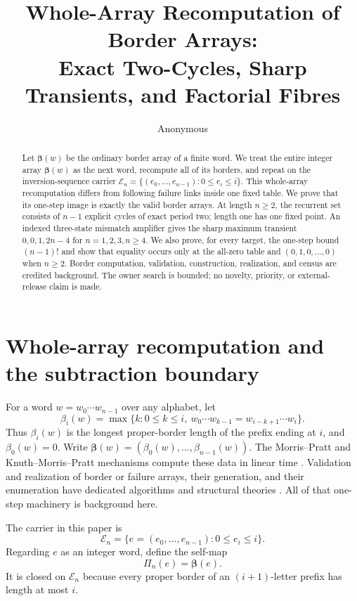 \documentclass[10pt,a4paper]{amsart}
\title[Whole-array recomputation of border arrays]{Whole-Array Recomputation of Border Arrays:\\
Exact Two-Cycles, Sharp Transients, and Factorial Fibres}
\author{Anonymous}
\date{}
\theoremstyle{definition}
\theoremstyle{remark}
\newcommand{\En}{\mathcal E_n}
\newcommand{\BA}{\boldsymbol\beta}
\begin{document}
\begin{abstract}
Let $\BA(w)$ be the ordinary border array of a finite word.  We treat the
entire integer array $\BA(w)$ as the next word, recompute all of its borders,
and repeat on the inversion-sequence carrier
$\En=\{(e_0,\ldots,e_{n-1}):0\le e_i\le i\}$.  This whole-array
recomputation differs from following failure links inside one fixed table.
We prove that its one-step image is exactly the valid border arrays.  At
length $n\ge2$, the recurrent set consists of $n-1$ explicit cycles of exact
period two; length one has one fixed point.  An indexed three-state mismatch
amplifier gives the sharp maximum transient
$0,0,1,2n-4$ for $n=1,2,3,n\ge4$.  We also prove, for every target, the
one-step bound $(n-1)!$ and show that equality occurs only at the all-zero
table and $(0,1,0,\ldots,0)$ when $n\ge2$.  Border computation, validation,
construction, realization, and census are credited background.  The owner
search is bounded; no novelty, priority, or external-release claim is made.
\end{abstract}

\maketitle

\section{Whole-array recomputation and the subtraction boundary}

For a word $w=w_0\cdots w_{n-1}$ over any alphabet, let
\begin{equation}
 \beta_i(w)=\max\{k:0\le k\le i,\ 
 w_0\cdots w_{k-1}=w_{i-k+1}\cdots w_i\}.             \label{eq:border}
\end{equation}
Thus $\beta_i(w)$ is the longest proper-border length of the prefix ending at
$i$, and $\beta_0(w)=0$.  Write
$\BA(w)=(\beta_0(w),\ldots,\beta_{n-1}(w))$.
The Morris--Pratt and Knuth--Morris--Pratt mechanisms compute these data in
linear time \cite{KnuthMorrisPratt1977}.  Validation and realization of
border or failure arrays, their generation, and their enumeration have
dedicated algorithms and structural theories
\cite{FranekEtAl2002,DuvalLecroqLefebvre2009,GawrychowskiJezJez2014}.
All of that one-step machinery is background here.

The carrier in this paper is
\begin{equation}
 \En=\{e=(e_0,\ldots,e_{n-1}):0\le e_i\le i\}.        \label{eq:carrier}
\end{equation}
Regarding $e$ as an integer word, define the self-map
\begin{equation}
                    \Pi_n(e)=\BA(e).                  \label{eq:update}
\end{equation}
It is closed on $\En$ because every proper border of an $(i+1)$-letter
prefix has length at most $i$.
\end{document}
